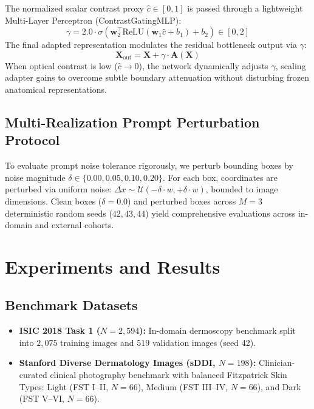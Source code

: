 \documentclass[runningheads]{llncs}
\begin{document}
The normalized scalar contrast proxy $\hat{c} \in [0, 1]$ is passed through a lightweight Multi-Layer Perceptron (ContrastGatingMLP):
\begin{equation}
\gamma = 2.0 \cdot \sigma\left(\mathbf{w}_2^\top \text{ReLU}(\mathbf{w}_1 \hat{c} + b_1) + b_2\right) \in [0, 2]
\end{equation}
The final adapted representation modulates the residual bottleneck output via $\gamma$:
\begin{equation}
\mathbf{X}_{\text{out}} = \mathbf{X} + \gamma \cdot \mathbf{A}(\mathbf{X})
\end{equation}
When optical contrast is low ($\hat{c} \to 0$), the network dynamically adjusts $\gamma$, scaling adapter gains to overcome subtle boundary attenuation without disturbing frozen anatomical representations.

\subsection{Multi-Realization Prompt Perturbation Protocol}
To evaluate prompt noise tolerance rigorously, we perturb bounding boxes by noise magnitude $\delta \in \{0.00, 0.05, 0.10, 0.20\}$. For each box, coordinates are perturbed via uniform noise: $\Delta x \sim \mathcal{U}(-\delta \cdot w, +\delta \cdot w)$, bounded to image dimensions. Clean boxes ($\delta = 0.0$) and perturbed boxes across $M=3$ deterministic random seeds ($42, 43, 44$) yield comprehensive evaluations across in-domain and external cohorts.

\section{Experiments and Results}

\subsection{Benchmark Datasets}
\begin{itemize}
    \item \textbf{ISIC 2018 Task 1 ($N=2,594$):} In-domain dermoscopy benchmark split into $2,075$ training images and $519$ validation images (seed 42).
    \item \textbf{Stanford Diverse Dermatology Images (sDDI, $N=198$):} Clinician-curated clinical photography benchmark with balanced Fitzpatrick Skin Types: Light (FST I--II, $N=66$), Medium (FST III--IV, $N=66$), and Dark (FST V--VI, $N=66$).
\end{itemize}
\end{document}
